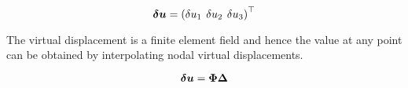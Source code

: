 \begin{equation}
  \vect{\delta u}=\transpose{\pbrac{\delta u_{1} \hspace{4 pt} \delta u_{2} \hspace{4 pt} \delta u_{3}}}
  \label{eqn:displacementvector}
\end{equation}

The virtual displacement is a finite element field and hence the value at any
point can be obtained by interpolating nodal virtual displacements.

\begin{equation}
  \vect{\delta u}=\matr{\Phi}\matr{\Delta}
  \label{eqn:interpolation}
\end{equation}

